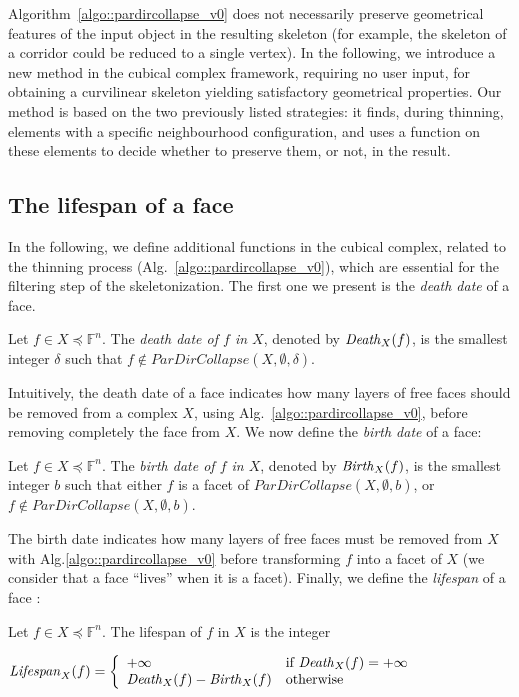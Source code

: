 \documentclass[final,envcountsame]{llncs}
\def\myem#1{{\em #1}}
\def\quotes#1{``#1''}
\def\birth#1#2{\mbox{\it{}Birth\/}_{#2}(#1)}
\def\death#1#2{\mbox{\it{}Death\/}_{#2}(#1)}
\def\lifespan#1#2{\mbox{\it{}Lifespan\/}_{#2}(#1)}
\def\allfaces#1{\mathbb{F}^{#1}}
\def\subcomplex#1#2{#1 \preceq #2}
\def\complex#1#2{\subcomplex{#2}{\allfaces{#1}}}
\begin{document}
Algorithm~\ref{algo::pardircollapse_v0} does not necessarily preserve geometrical features of the input object in the resulting skeleton (for example, the skeleton of a corridor could be reduced to a single vertex). In the following, we introduce a new method in the cubical complex framework, requiring no user input, for obtaining a curvilinear skeleton yielding satisfactory geometrical properties. Our method is based on the two previously listed strategies: it finds, during thinning, elements with a specific neighbourhood configuration, and uses a function on these elements to decide whether to preserve them, or not, in the result.

\subsection{The lifespan of a face}
In the following, we define additional functions in the cubical complex, related to the thinning process (Alg.~\ref{algo::pardircollapse_v0}), which are essential for the filtering step of the skeletonization. The first one we present is the \myem{death date} of a face.

\begin{definition}
Let $f \in \complex{n}{X}$. The \myem{death date of $f$ in $X$}, denoted by $\death{f}{X}$, is the smallest integer $\delta$ such that $f \notin ParDirCollapse(X, \emptyset, \delta)$. 
\end{definition}

Intuitively, the death date of a face indicates how many layers of free faces should be removed from a complex $X$, using Alg.~\ref{algo::pardircollapse_v0}, before removing completely the face from $X$. We now define the \myem{birth date} of a face:

\begin{definition}
Let $f \in \complex{n}{X}$. The \myem{birth date of $f$ in $X$}, denoted by $\birth{f}{X}$, is the smallest integer $b$ such that either $f$ is a facet of $ParDirCollapse(X, \emptyset, b)$, or $f \notin ParDirCollapse(X, \emptyset, b)$.
\end{definition}

The birth date indicates how many layers of free faces must be removed from $X$ with Alg.\ref{algo::pardircollapse_v0} before transforming $f$ into a facet of $X$ (we consider that a face \quotes{lives} when it is a facet).
Finally, we define the \myem{lifespan} of a face :

\begin{definition}
Let $f \in \complex{n}{X}$. The lifespan of $f$ in $X$ is the integer 

\begin{math}
\lifespan{f}{X} = \left\{
\begin{array}{ll}
+\infty & \text{if $\death{f}{X}=+\infty$}\\
\death{f}{X} - \birth{f}{X} & \text{otherwise}
\end{array}
\right.
\end{math}
\end{definition}
\end{document}
